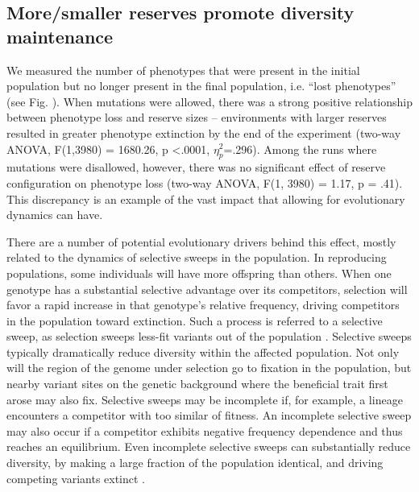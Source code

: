 \documentclass[letterpaper]{article}
\begin{document}
\subsection{More/smaller reserves promote diversity maintenance}

	We measured the number of phenotypes that were present in the initial population but no longer present in the final population, i.e. “lost phenotypes” (see Fig. \label{fig:diversitygenerationmaintenance}).  When mutations were allowed, there was a strong positive relationship between phenotype loss and reserve sizes – environments with larger reserves resulted in greater phenotype extinction by the end of the experiment (two-way ANOVA, F(1,3980) = 1680.26, p \textless .0001, $\eta_{p}^{2}$=.296).  Among the runs where mutations were disallowed, however, there was no significant effect of reserve configuration on phenotype loss (two-way ANOVA, F(1, 3980) = 1.17, p = .41). This discrepancy is an example of the vast impact that allowing for evolutionary dynamics can have. 

There are a number of potential evolutionary drivers behind this effect, mostly related to the dynamics of selective sweeps in the population. In reproducing populations, some individuals will have more offspring than others.  When one genotype has a substantial selective advantage over its competitors, selection will favor a rapid increase in that genotype’s relative frequency, driving competitors in the population toward extinction.  Such a process is referred to a selective sweep, as selection sweeps less-fit variants out of the population \cite{mcvean_structure_2007}.  Selective sweeps typically dramatically reduce diversity within the affected population.  Not only will the region of the genome under selection go to fixation in the population, but nearby variant sites on the genetic background where the beneficial trait first arose may also fix.  Selective sweeps may be incomplete if, for example, a lineage encounters a competitor with too similar of fitness. An incomplete selective sweep may also occur if a competitor exhibits negative frequency dependence and thus reaches an equilibrium.  Even incomplete selective sweeps can substantially reduce diversity, by making a large fraction of the population identical, and driving competing variants extinct .
%
%
%
\end{document}
